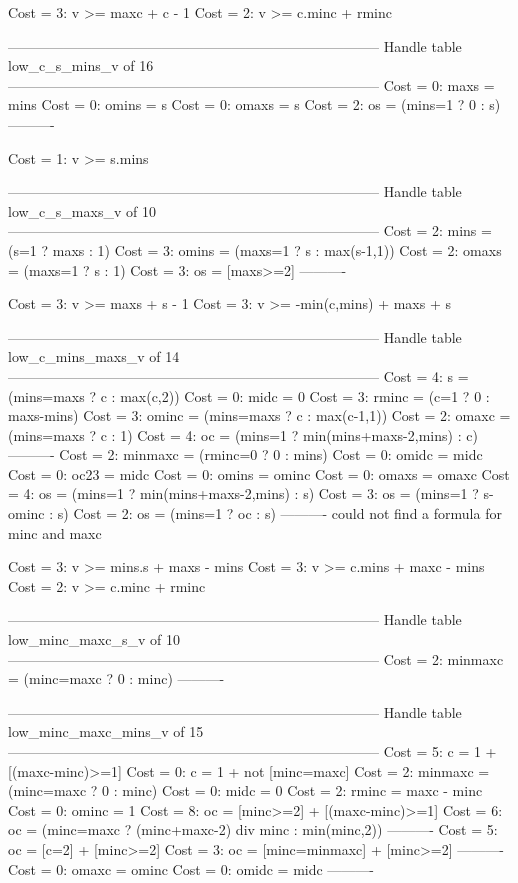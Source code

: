 Cost =  3:  v >= maxc + c - 1
Cost =  2:  v >= c.minc + rminc

--------------------------------------------------------------------------------
Handle table low_c_s_mins_v of 16
--------------------------------------------------------------------------------
Cost =  0:  maxs  = mins
Cost =  0:  omins = s
Cost =  0:  omaxs = s
Cost =  2:  os    = (mins=1 ? 0 : s)
----------

Cost =  1:  v >= s.mins

--------------------------------------------------------------------------------
Handle table low_c_s_maxs_v of 10
--------------------------------------------------------------------------------
Cost =  2:  mins  = (s=1 ? maxs : 1)
Cost =  3:  omins = (maxs=1 ? s : max(s-1,1))
Cost =  2:  omaxs = (maxs=1 ? s : 1)
Cost =  3:  os    = [maxs>=2]
----------

Cost =  3:  v >= maxs + s - 1
Cost =  3:  v >= -min(c,mins) + maxs + s

--------------------------------------------------------------------------------
Handle table low_c_mins_maxs_v of 14
--------------------------------------------------------------------------------
Cost =  4:  s       = (mins=maxs ? c : max(c,2))
Cost =  0:  midc    = 0
Cost =  3:  rminc   = (c=1 ? 0 : maxs-mins)
Cost =  3:  ominc   = (mins=maxs ? c : max(c-1,1))
Cost =  2:  omaxc   = (mins=maxs ? c : 1)
Cost =  4:  oc      = (mins=1 ? min(mins+maxs-2,mins) : c)
----------
Cost =  2:  minmaxc = (rminc=0 ? 0 : mins)
Cost =  0:  omidc   = midc
Cost =  0:  oc23    = midc
Cost =  0:  omins   = ominc
Cost =  0:  omaxs   = omaxc
Cost =  4:  os      = (mins=1 ? min(mins+maxs-2,mins) : s)
Cost =  3:  os      = (mins=1 ? s-ominc : s)
Cost =  2:  os      = (mins=1 ? oc : s)
----------
could not find a formula for minc and maxc

Cost =  3:  v >= mins.s + maxs - mins
Cost =  3:  v >= c.mins + maxc - mins
Cost =  2:  v >= c.minc + rminc

--------------------------------------------------------------------------------
Handle table low_minc_maxc_s_v of 10
--------------------------------------------------------------------------------
Cost =  2:  minmaxc = (minc=maxc ? 0 : minc)
----------


--------------------------------------------------------------------------------
Handle table low_minc_maxc_mins_v of 15
--------------------------------------------------------------------------------
Cost =  5:  c       = 1 + [(maxc-minc)>=1]
Cost =  0:  c       = 1 + not [minc=maxc]
Cost =  2:  minmaxc = (minc=maxc ? 0 : minc)
Cost =  0:  midc    = 0
Cost =  2:  rminc   = maxc - minc
Cost =  0:  ominc   = 1
Cost =  8:  oc      = [minc>=2] + [(maxc-minc)>=1]
Cost =  6:  oc      = (minc=maxc ? (minc+maxc-2) div minc : min(minc,2))
----------
Cost =  5:  oc      = [c=2] + [minc>=2]
Cost =  3:  oc      = [minc=minmaxc] + [minc>=2]
----------
Cost =  0:  omaxc   = ominc
Cost =  0:  omidc   = midc
----------

